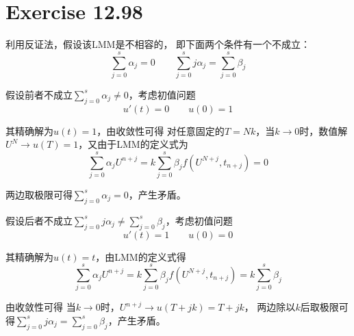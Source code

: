 \documentclass[a4paper]{article}
\begin{document}
\section*{Exercise 12.98}

\par 利用反证法，假设该LMM是不相容的，
即下面两个条件有一个不成立：
\begin{equation}
    \sum_{j=0}^{s}\alpha_j=0
    \qquad
    \sum_{j=0}^{s} j\alpha_j = \sum_{j=0}^{s} \beta_j
\end{equation}
\par 假设前者不成立$\displaystyle\sum_{j=0}^{s}\alpha_j\neq0$，考虑初值问题
\begin{equation}
    u'(t)=0 \qquad u(0)=1
\end{equation}
\par 其精确解为$u(t)=1$，由收敛性可得
对任意固定的$T=Nk$，当$k\to0$时，数值解$U^N\to u(T)=1$，又由于LMM的定义式为
\begin{equation}
    \sum_{j=0}^{s}\alpha_j U^{n+j} = k\sum_{j=0}^{s} \beta_j f(U^{N+j},t_{n+j})=0
\end{equation}
\par 两边取极限可得$\displaystyle\sum_{j=0}^{s}\alpha_j=0$，产生矛盾。

\par 假设后者不成立$\displaystyle\sum_{j=0}^{s}j\alpha_j\neq \sum_{j=0}^{s} \beta_j$，考虑初值问题
\begin{equation}
    u'(t)=1 \qquad u(0)=0
\end{equation}
\par 其精确解为$u(t)=t$，由LMM的定义式得
\begin{equation}
    \sum_{j=0}^{s}\alpha_j U^{n+j} = k\sum_{j=0}^{s} \beta_j f(U^{N+j},t_{n+j})=
    k\sum_{j=0}^{s} \beta_j
\end{equation}
\par 由收敛性可得
当$k\to0$时，$U^{n+j}\to u(T+jk)=T+jk$，
两边除以$k$后取极限可得$\displaystyle\sum_{j=0}^{s}j\alpha_j = \sum_{j=0}^{s} \beta_j$，产生矛盾。



\printbibliography
\end{document}
